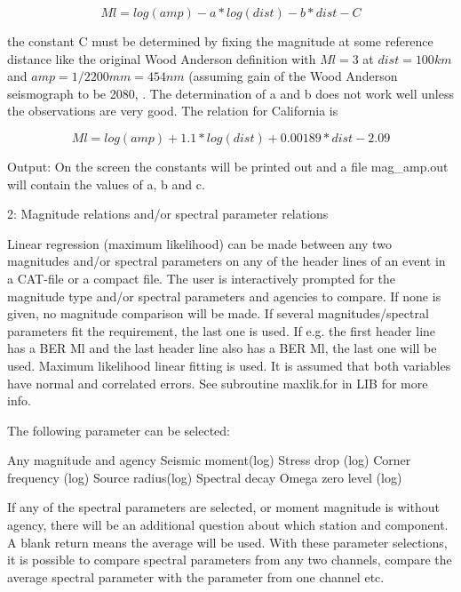 \begin{displaymath}
Ml = log(amp) - a * log(dist) - b * dist - C 
\end{displaymath}

the constant C must be determined by fixing the magnitude at some 
reference distance like the original Wood Anderson definition with 
$Ml = 3$ at $dist= 100 km$ and $amp=1/2200 mm = 454 nm$ (assuming gain of 
the Wood Anderson seismograph to be 2080, \citep{hutton1987}. 
The determination of a and b does not work well unless the observations 
are very good. The relation for California is \citep{hutton1987}

\begin{displaymath}
Ml = log(amp) + 1.1 *log(dist) + 0.00189 * dist - 2.09 
\end{displaymath}

Output: On the screen the constants will be printed out and a file mag\_amp.out will contain the values of a, b and c. 

2: Magnitude relations and/or spectral parameter relations 

Linear regression (maximum likelihood) can be made between any two magnitudes and/or spectral parameters on any of the header lines of an event in a CAT-file or a compact file. The user is interactively prompted for the magnitude type and/or spectral parameters and agencies to compare. If none is given, no magnitude comparison will be made. If several magnitudes/spectral parameters fit the requirement, the last one is used. If e.g. the first header line has a BER Ml and the last header line also has a BER Ml, the last one will be used.  Maximum likelihood linear fitting is used. It is assumed that both variables have normal and correlated errors. See subroutine maxlik.for in LIB for more info. 

The following parameter can be selected: 

Any magnitude and agency \newline
Seismic moment(log) \newline
Stress drop (log) \newline
Corner frequency (log) \newline
Source radius(log) \newline
Spectral decay \newline
Omega zero level (log) 

If any of the spectral parameters are selected, or  moment magnitude is without agency, there will be an additional question about which station and component. A blank return means the average will be used. With these parameter selections, it is possible to compare spectral parameters from any two channels, compare the average spectral parameter with the parameter from one channel etc. 

